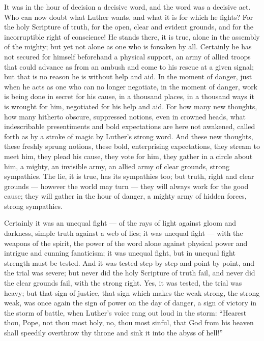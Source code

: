 \documentclass[12pt,a4paper,openany]{book}
\newcommand{\opage}[1]{\marginnote{\footnotesize\textit{[#1]}}}
\begin{document}
It was in the hour of decision a decisive word, and
the word was a decisive act. Who can now doubt
what Luther wants, and what it is for which he fights? For
the holy Scripture of truth, for the open, clear and evident
grounds, and for the incorruptible right of conscience!
\opage{13}He stands there, it is true, alone in the assembly of the mighty; but
yet not alone as one who is forsaken by all. Certainly he has
not secured for himself beforehand a physical support, an army of
allied troops that could advance as from an ambush
and come to his rescue at a given signal; but that is no reason
he is without help and aid. In the moment of danger, just
when he acts as one who can no longer negotiate, in
the moment of danger, work is being done in secret for his
cause, in a thousand places, in a thousand ways it is wrought for him,
negotiated for his help and aid. For how many
new thoughts, how many hitherto obscure, suppressed notions, even in crowned heads, what indescribable
presentiments and bold expectations are here not awakened, called
forth as by a stroke of magic by Luther's strong word. And these
new thoughts, these freshly sprung notions, these bold,
enterprising expectations, they stream to meet him, they plead his
cause, they vote for him, they gather in a circle about him,
a mighty, an invisible army, an allied army of clear grounds,
strong sympathies. The lie, it is true, has its sympathies too;
but truth, right and clear grounds --- however
the world may turn --- they will always work for the good
cause; they will gather in the hour of danger, a mighty army
of hidden forces, strong sympathies.

Certainly it was an unequal fight --- of the rays of light
against gloom and darkness, simple truth against a web of
lies; it was unequal fight --- with the weapons of the spirit, the power of the word
alone against physical power and intrigue and cunning
fanaticism; it was unequal fight, but in unequal fight
strength must be tested. And it was tested step by step and
point by point, and the trial was severe; but never
did the holy Scripture of truth fail, and never did
the clear grounds fail, with the strong right. Yes, it was tested,
the trial was heavy; but that sign of justice, that
\opage{14}sign which makes the weak strong, the strong weak, was once again
the sign of power on the day of danger, a sign of victory in the storm
of battle, when Luther's voice rang out loud in the storm: ``Hearest thou,
Pope, not thou most holy, no, thou most sinful, that God
from his heaven shall speedily overthrow thy throne and sink it
into the abyss of hell!''
\end{document}
